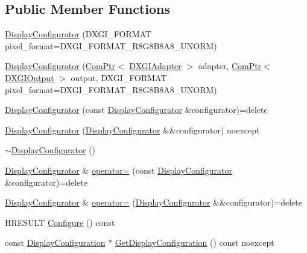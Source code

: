\subsection*{Public Member Functions}
\begin{DoxyCompactItemize}
\item 
\mbox{\hyperlink{classmage_1_1rendering_1_1_display_configurator_a533ffee38e3930c1d27db3891ffe8c16}{Display\+Configurator}} (D\+X\+G\+I\+\_\+\+F\+O\+R\+M\+AT pixel\+\_\+format=D\+X\+G\+I\+\_\+\+F\+O\+R\+M\+A\+T\+\_\+\+R8\+G8\+B8\+A8\+\_\+\+U\+N\+O\+RM)
\item 
\mbox{\hyperlink{classmage_1_1rendering_1_1_display_configurator_aa76c3bb137954b7c0deb1d80d1050638}{Display\+Configurator}} (\mbox{\hyperlink{namespacemage_ae74f374780900893caa5555d1031fd79}{Com\+Ptr}}$<$ \mbox{\hyperlink{namespacemage_1_1rendering_ad55e028ebd705b547eeb972ad8d03b6a}{D\+X\+G\+I\+Adapter}} $>$ adapter, \mbox{\hyperlink{namespacemage_ae74f374780900893caa5555d1031fd79}{Com\+Ptr}}$<$ \mbox{\hyperlink{namespacemage_1_1rendering_aaf22d3893277a4bd8497f6ea69b01532}{D\+X\+G\+I\+Output}} $>$ output, D\+X\+G\+I\+\_\+\+F\+O\+R\+M\+AT pixel\+\_\+format=D\+X\+G\+I\+\_\+\+F\+O\+R\+M\+A\+T\+\_\+\+R8\+G8\+B8\+A8\+\_\+\+U\+N\+O\+RM)
\item 
\mbox{\hyperlink{classmage_1_1rendering_1_1_display_configurator_aa1c3dbea2453d12d3478db4724c78728}{Display\+Configurator}} (const \mbox{\hyperlink{classmage_1_1rendering_1_1_display_configurator}{Display\+Configurator}} \&configurator)=delete
\item 
\mbox{\hyperlink{classmage_1_1rendering_1_1_display_configurator_ac75dae1c4df34dda067f1a5d99fdfefa}{Display\+Configurator}} (\mbox{\hyperlink{classmage_1_1rendering_1_1_display_configurator}{Display\+Configurator}} \&\&configurator) noexcept
\item 
\mbox{\hyperlink{classmage_1_1rendering_1_1_display_configurator_a5ccba8cd97da75a7d1c425731fb848d4}{$\sim$\+Display\+Configurator}} ()
\item 
\mbox{\hyperlink{classmage_1_1rendering_1_1_display_configurator}{Display\+Configurator}} \& \mbox{\hyperlink{classmage_1_1rendering_1_1_display_configurator_affd6a3486be8564246628a6a20518ac2}{operator=}} (const \mbox{\hyperlink{classmage_1_1rendering_1_1_display_configurator}{Display\+Configurator}} \&configurator)=delete
\item 
\mbox{\hyperlink{classmage_1_1rendering_1_1_display_configurator}{Display\+Configurator}} \& \mbox{\hyperlink{classmage_1_1rendering_1_1_display_configurator_afa750c6d058e2298dd6bb9cf44d54f06}{operator=}} (\mbox{\hyperlink{classmage_1_1rendering_1_1_display_configurator}{Display\+Configurator}} \&\&configurator)=delete
\item 
H\+R\+E\+S\+U\+LT \mbox{\hyperlink{classmage_1_1rendering_1_1_display_configurator_abeafddcb31aea4ee7235ca5509f1b321}{Configure}} () const
\item 
const \mbox{\hyperlink{classmage_1_1rendering_1_1_display_configuration}{Display\+Configuration}} $\ast$ \mbox{\hyperlink{classmage_1_1rendering_1_1_display_configurator_a5b0440099e3e31977ffaf8072c9fb33f}{Get\+Display\+Configuration}} () const noexcept
\end{DoxyCompactItemize}
